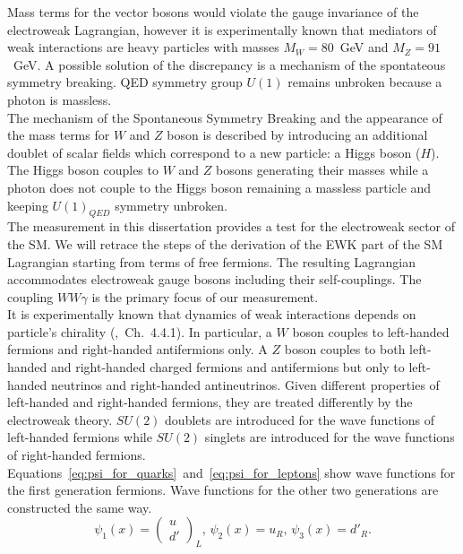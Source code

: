 Mass terms for the vector bosons would violate the gauge invariance of the electroweak Lagrangian, however it is experimentally known that mediators of weak interactions are heavy particles with masses $M_W=80$~GeV and $M_Z=91$~GeV. A possible solution of the discrepancy is a mechanism of the spontateous symmetry breaking. QED symmetry group $U(1)$ remains unbroken because a photon is massless.\\

The mechanism of the Spontaneous Symmetry Breaking and the appearance of the mass terms for $W$ and $Z$ boson is described by introducing an additional doublet of scalar fields which correspond to a new particle: a Higgs boson ($H$). The Higgs boson couples to $W$ and $Z$ bosons generating their masses while a photon does not couple to the Higgs boson remaining a massless particle and keeping $U(1)_{QED}$ symmetry unbroken.\\

The measurement in this dissertation provides a test for the electroweak sector of the SM. We will retrace the steps of the derivation of the EWK part of the SM Lagrangian starting from terms of free fermions. The resulting Lagrangian accommodates electroweak gauge bosons including their self-couplings. The coupling $WW\gamma$ is the primary focus of our measurement.\\

It is experimentally known that dynamics of weak interactions depends on particle's chirality (\cite{ref_Griffiths},~Ch.~4.4.1). In particular, a $W$ boson couples to left-handed fermions and right-handed antifermions only. A $Z$ boson couples to both left-handed and right-handed charged fermions and antifermions but only to left-handed neutrinos and right-handed antineutrinos. Given different properties of left-handed and right-handed fermions, they are treated differently by the electroweak theory. $SU(2)$ doublets are introduced for the wave functions of left-handed fermions while $SU(2)$ singlets are introduced for the wave functions of right-handed fermions. Equations~\ref{eq:psi_for_quarks}~and~\ref{eq:psi_for_leptons} show wave functions for the first generation fermions. Wave functions for the other two generations are constructed the same way.\\ 
 
\begin{equation}\label{eq:psi_for_quarks}
\psi_1(x)=\begin{pmatrix} u \\ d' \end{pmatrix}_L \text{, } \psi_2(x)=u_R \text{, } \psi_3(x)=d'_R \text{.}
\end{equation}

